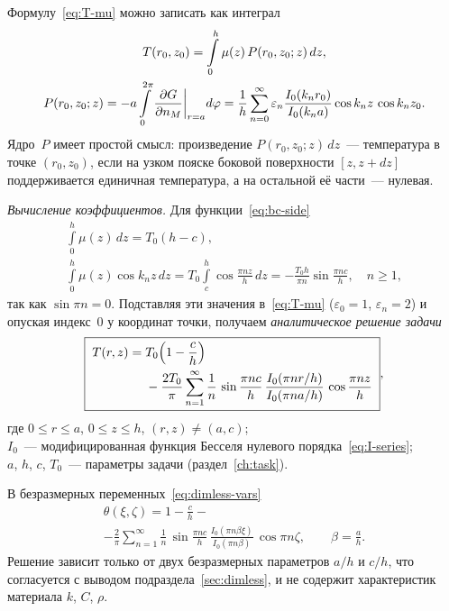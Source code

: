 Формулу~\eqref{eq:T-mu} можно записать как интеграл
\begin{gather}
\label{eq:poisson}
T(r_0,z_0)=\int\limits_0^h\mu(z)\,P(r_0,z_0;z)\,dz,\\
\label{eq:poisson-kernel}
P(r_0,z_0;z)=-a\int\limits_0^{2\pi}\dfrac{\partial G}{\partial n_M}\bigg|_{r=a}d\varphi
=\frac1h\sum_{n=0}^{\infty}\varepsilon_n
\frac{I_0(k_n r_0)}{I_0(k_n a)}\cos k_n z\,\cos k_n z_0 .
\end{gather}
Ядро~$P$ имеет простой смысл: произведение $P(r_0,z_0;z)\,dz$~—
температура в точке $(r_0,z_0)$, если на узком пояске боковой
поверхности $[z,z+dz]$ поддерживается единичная температура, а на
остальной её части~— нулевая.

\emph{Вычисление коэффициентов.} Для функции~\eqref{eq:bc-side}
\begin{gather*}
\int\limits_0^h\mu(z)\,dz=T_0(h-c),\\
\int\limits_0^h\mu(z)\cos k_n z\,dz=T_0\int\limits_c^h\cos\frac{\pi nz}{h}\,dz
=-\frac{T_0 h}{\pi n}\sin\frac{\pi nc}{h},\quad n\ge1,
\end{gather*}
так как $\sin\pi n=0$. Подставляя эти значения в~\eqref{eq:T-mu}
($\varepsilon_0=1$, $\varepsilon_n=2$) и опуская индекс~0 у координат
точки, получаем \emph{аналитическое решение задачи}
\begin{equation}
\label{eq:solution}
\boxed{\;
\begin{aligned}
T(r,z)={}&T_0\Bigl(1-\frac{c}{h}\Bigr)\\
&-\frac{2T_0}{\pi}\sum_{n=1}^{\infty}\frac{1}{n}\,
\sin\frac{\pi nc}{h}\,
\frac{I_0(\pi nr/h)}{I_0(\pi na/h)}\,
\cos\frac{\pi nz}{h}
\end{aligned}\;},
\postdisplaypenalty=10000
\end{equation}
где $0\le r\le a$, $0\le z\le h$, $(r,z)\ne(a,c)$;\\
\hphantom{где }$I_0$~— модифицированная функция Бесселя нулевого
порядка~\eqref{eq:I-series};\\
\hphantom{где }$a$, $h$, $c$, $T_0$~— параметры задачи
(раздел~\ref{ch:task}).

В безразмерных переменных~\eqref{eq:dimless-vars}
\begin{multline}
\label{eq:solution-dimless}
\theta(\xi,\zeta)=1-\frac{c}{h}-{}\\
-\frac{2}{\pi}\sum_{n=1}^{\infty}\frac{1}{n}\,
\sin\frac{\pi nc}{h}\,
\frac{I_0(\pi n\beta\xi)}{I_0(\pi n\beta)}\,
\cos\pi n\zeta,\qquad \beta=\frac{a}{h} .
\end{multline}
Решение зависит только от двух безразмерных параметров $a/h$ и $c/h$,
что согласуется с выводом подраздела~\ref{sec:dimless}, и не содержит
характеристик материала $k$, $C$, $\rho$.

